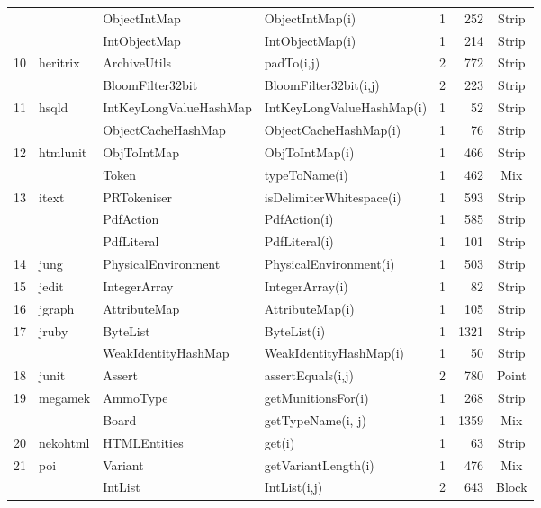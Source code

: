 \begin{table}[H]
{{\begin{tabular}{|l|l|l|l|r|r|c|}
	&				& ObjectIntMap			& ObjectIntMap(i)			& 1			& 252	& Strip 										\\ 
	&				& IntObjectMap			& IntObjectMap(i)			& 1			& 214	& Strip 										\\ 
10	&	heritrix		& ArchiveUtils			& padTo(i,j)				& 2			& 772	& Strip  										\\ 
	&				& BloomFilter32bit 		& BloomFilter32bit(i,j)		& 2	 		& 223	& Strip  										\\ 
11	&	hsqld		& IntKeyLongValueHashMap& IntKeyLongValueHashMap(i)& 1		& 52	& Strip 										\\ 
	&				& ObjectCacheHashMap	& ObjectCacheHashMap(i)	& 1			& 76	& Strip   										\\ 
12	&	htmlunit		& ObjToIntMap			& ObjToIntMap(i)			& 1			& 466	& Strip  										\\ 
	&				& Token					& typeToName(i)			& 1			& 462	& Mix 										\\ 
13	&	itext		& PRTokeniser			& isDelimiterWhitespace(i)	& 1			& 593	& Strip  										\\ 
	&				& PdfAction				& PdfAction(i)			& 1			& 585	& Strip  										\\ 
	&				& PdfLiteral				& PdfLiteral(i)			& 1			& 101	& Strip 										\\ 
14	&	jung		& PhysicalEnvironment	& PhysicalEnvironment(i)	& 1			& 503	& Strip 										\\ 
15	&	jedit		& IntegerArray			& IntegerArray(i)			& 1			& 82	& Strip  										\\ 
16	&	jgraph		& AttributeMap			& AttributeMap(i)			& 1			& 105	& Strip										\\ 
17	&	jruby		& ByteList				& ByteList(i)				& 1			& 1321	& Strip 										\\ 
	&				& WeakIdentityHashMap	& WeakIdentityHashMap(i)	& 1			& 50	& Strip 										\\ 
18	&	junit		& Assert					& assertEquals(i,j)		& 2			& 780	& Point 										\\ 
19	&	megamek	& AmmoType			& getMunitionsFor(i)		& 1			& 268	& Strip	  									\\ 			
	&				& Board					& getTypeName(i, j)		& 1			& 1359	& Mix 										\\ 
20	&	nekohtml	& HTMLEntities			& get(i)					& 1			& 63	& Strip  										\\ 
21	&	poi			& Variant				& getVariantLength(i)		& 1			& 476	& Mix  										\\ 
	&				& IntList					& IntList(i,j)				& 2			& 643	& Block 										\\ 	

\end{tabular}}}
\end{table}
